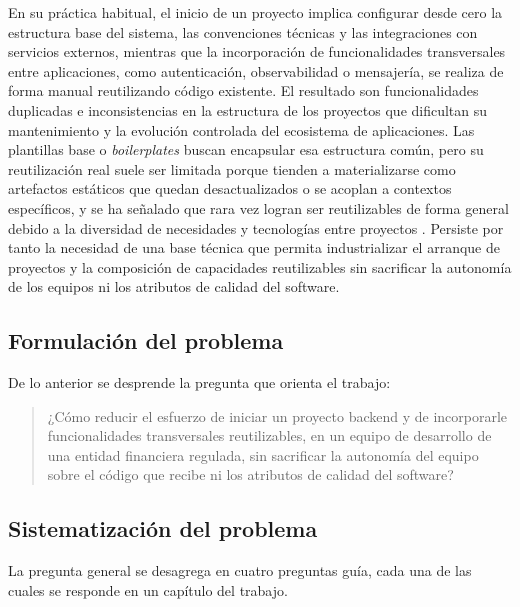 En su práctica habitual, el inicio de un proyecto implica configurar
desde cero la estructura base del sistema, las convenciones técnicas y
las integraciones con servicios externos, mientras que la incorporación
de funcionalidades transversales entre aplicaciones, como autenticación,
observabilidad o mensajería, se realiza de forma manual reutilizando
código existente. El resultado son funcionalidades duplicadas e
inconsistencias en la estructura de los proyectos que dificultan su
mantenimiento y la evolución controlada del ecosistema de aplicaciones.
Las plantillas base o \emph{boilerplates} buscan encapsular esa
estructura común, pero su reutilización real suele ser limitada porque
tienden a materializarse como artefactos estáticos que quedan
desactualizados o se acoplan a contextos específicos, y se ha señalado
que rara vez logran ser reutilizables de forma general debido a la
diversidad de necesidades y tecnologías entre proyectos
\citep{SeanPromsopeak2022}. Persiste por tanto la necesidad de una base
técnica que permita industrializar el arranque de proyectos y la
composición de capacidades reutilizables sin sacrificar la autonomía de
los equipos ni los atributos de calidad del software.

\subsection{Formulación del problema}
\label{sec:formulacion}

De lo anterior se desprende la pregunta que orienta el trabajo:

\begin{quote}
¿Cómo reducir el esfuerzo de iniciar un proyecto backend y de incorporarle
funcionalidades transversales reutilizables, en un equipo de desarrollo de
una entidad financiera regulada, sin sacrificar la autonomía del equipo sobre
el código que recibe ni los atributos de calidad del software?
\end{quote}

\subsection{Sistematización del problema}
\label{sec:sistematizacion}

La pregunta general se desagrega en cuatro preguntas guía, cada una de las
cuales se responde en un capítulo del trabajo.

